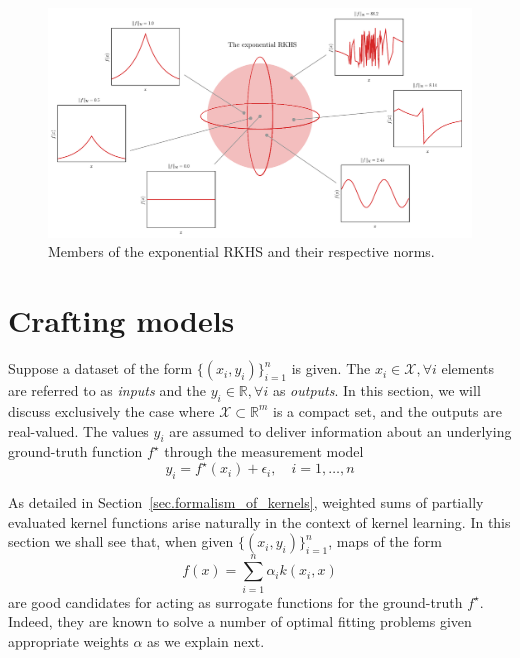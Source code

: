 \begin{landscape}
\begin{figure}
	\includegraphics{../images/chap2_rkhs_ex.pdf} 
	\caption{Members of the exponential RKHS and their respective norms.}
	\label{fig.rkhs_ex}
\end{figure}
\end{landscape}


\section{Crafting models}
\label{sec.crafting_models}

Suppose a dataset of the form $\{(x_i,y_i)\}_{i=1}^n$ is given. The $x_i \in \mathcal{X}, \forall i$ elements are referred to as \textit{inputs} and the $y_i \in \mathbb{R}, \forall i$ as \textit{outputs}. In this section, we will discuss exclusively the case where $\mathcal{X} \subset \mathbb{R}^m$ is a compact set, and the outputs are real-valued. The values $y_i$ are assumed to deliver information about an underlying ground-truth function $f^\star$ through the measurement model
\begin{equation}
	y_i = f^\star(x_i) + \epsilon_i, \quad i=1,\dots,n
\end{equation}

As detailed in Section~\ref{sec.formalism_of_kernels}, weighted sums of partially evaluated kernel functions arise naturally in the context of kernel learning. In this section we shall see that, when given $\{(x_i,y_i)\}_{i=1}^n$, maps of the form
\begin{equation}
	f(x) = \sum_{i=1}^n \alpha_i k(x_i,x)
\end{equation}
are good candidates for acting as surrogate functions for the ground-truth $f^\star$. Indeed, they are known to solve a number of optimal fitting problems given appropriate weights $\alpha$ as we explain next.

